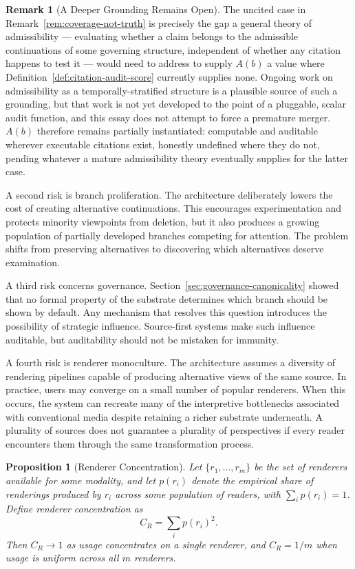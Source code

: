 \documentclass[11pt]{article}
\newtheorem{proposition}[theorem]{Proposition}
\theoremstyle{definition}
\newtheorem{remark}[theorem]{Remark}
\begin{document}
\begin{remark}[A Deeper Grounding Remains Open]
\label{rem:deeper-grounding}
The uncited case in Remark~\ref{rem:coverage-not-truth} is precisely the gap a general theory of admissibility --- evaluating whether a claim belongs to the admissible continuations of some governing structure, independent of whether any citation happens to test it --- would need to address to supply $A(b)$ a value where Definition~\ref{def:citation-audit-score} currently supplies none. Ongoing work on admissibility as a temporally-stratified structure is a plausible source of such a grounding, but that work is not yet developed to the point of a pluggable, scalar audit function, and this essay does not attempt to force a premature merger. $A(b)$ therefore remains partially instantiated: computable and auditable wherever executable citations exist, honestly undefined where they do not, pending whatever a mature admissibility theory eventually supplies for the latter case.
\end{remark}

A second risk is branch proliferation. The architecture deliberately lowers the cost of creating alternative continuations. This encourages experimentation and protects minority viewpoints from deletion, but it also produces a growing population of partially developed branches competing for attention. The problem shifts from preserving alternatives to discovering which alternatives deserve examination.

A third risk concerns governance. Section~\ref{sec:governance-canonicality} showed that no formal property of the substrate determines which branch should be shown by default. Any mechanism that resolves this question introduces the possibility of strategic influence. Source-first systems make such influence auditable, but auditability should not be mistaken for immunity.

A fourth risk is renderer monoculture. The architecture assumes a diversity of rendering pipelines capable of producing alternative views of the same source. In practice, users may converge on a small number of popular renderers. When this occurs, the system can recreate many of the interpretive bottlenecks associated with conventional media despite retaining a richer substrate underneath. A plurality of sources does not guarantee a plurality of perspectives if every reader encounters them through the same transformation process.

\begin{proposition}[Renderer Concentration]
\label{prop:renderer-concentration}
Let $\{r_1, \dots, r_m\}$ be the set of renderers available for some modality, and let $p(r_i)$ denote the empirical share of renderings produced by $r_i$ across some population of readers, with $\sum_i p(r_i) = 1$. Define renderer concentration as
\[
C_R = \sum_i p(r_i)^2.
\]
Then $C_R \to 1$ as usage concentrates on a single renderer, and $C_R = 1/m$ when usage is uniform across all $m$ renderers.
\end{proposition}
\end{document}
